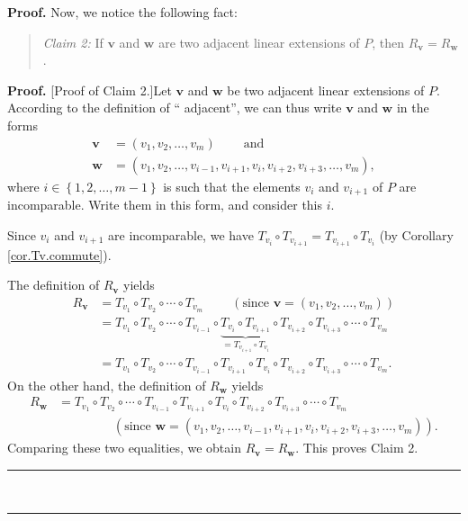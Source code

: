 \documentclass[numbers=enddot,12pt,final,onecolumn,notitlepage]{scrartcl}%
\theoremstyle{definition}
\newenvironment{verlong}{}{}
\newenvironment{statement}{\begin{quote}}{\end{quote}}
\newenvironment{proof}[1][Proof]{\noindent\textbf{#1.} }{\ \rule{0.5em}{0.5em}}
\begin{document}
\begin{verlong}
\begin{proof}
Now, we notice the following fact:

\begin{statement}
\textit{Claim 2:} If $\mathbf{v}$ and $\mathbf{w}$ are two adjacent linear
extensions of $P$, then $R_{\mathbf{v}}=R_{\mathbf{w}}$.
\end{statement}

\begin{proof}
[Proof of Claim 2.]Let $\mathbf{v}$ and $\mathbf{w}$ be two adjacent linear
extensions of $P$. According to the definition of \textquotedblleft
adjacent\textquotedblright, we can thus write $\mathbf{v}$ and $\mathbf{w}$ in
the forms
\begin{align*}
\mathbf{v}  &  =\left(  v_{1},v_{2},\ldots,v_{m}\right)
\ \ \ \ \ \ \ \ \ \ \text{and}\\
\mathbf{w}  &  =\left(  v_{1},v_{2},\ldots,v_{i-1},v_{i+1},v_{i}%
,v_{i+2},v_{i+3},\ldots,v_{m}\right)  ,
\end{align*}
where $i\in\left\{  1,2,\ldots,m-1\right\}  $ is such that the elements
$v_{i}$ and $v_{i+1}$ of $P$ are incomparable. Write them in this form, and
consider this $i$.

Since $v_{i}$ and $v_{i+1}$ are incomparable, we have $T_{v_{i}}\circ
T_{v_{i+1}}=T_{v_{i+1}}\circ T_{v_{i}}$ (by Corollary \ref{cor.Tv.commute}).

The definition of $R_{\mathbf{v}}$ yields
\begin{align*}
R_{\mathbf{v}}  &  =T_{v_{1}}\circ T_{v_{2}}\circ\cdots\circ T_{v_{m}%
}\ \ \ \ \ \ \ \ \ \ \left(  \text{since }\mathbf{v}=\left(  v_{1}%
,v_{2},\ldots,v_{m}\right)  \right) \\
&  =T_{v_{1}}\circ T_{v_{2}}\circ\cdots\circ T_{v_{i-1}}\circ
\underbrace{T_{v_{i}}\circ T_{v_{i+1}}}_{=T_{v_{i+1}}\circ T_{v_{i}}}\circ
T_{v_{i+2}}\circ T_{v_{i+3}}\circ\cdots\circ T_{v_{m}}\\
&  =T_{v_{1}}\circ T_{v_{2}}\circ\cdots\circ T_{v_{i-1}}\circ T_{v_{i+1}}\circ
T_{v_{i}}\circ T_{v_{i+2}}\circ T_{v_{i+3}}\circ\cdots\circ T_{v_{m}}.
\end{align*}
On the other hand, the definition of $R_{\mathbf{w}}$ yields
\begin{align*}
R_{\mathbf{w}}  &  =T_{v_{1}}\circ T_{v_{2}}\circ\cdots\circ T_{v_{i-1}}\circ
T_{v_{i+1}}\circ T_{v_{i}}\circ T_{v_{i+2}}\circ T_{v_{i+3}}\circ\cdots\circ
T_{v_{m}}\\
&  \ \ \ \ \ \ \ \ \ \ \ \ \ \ \ \ \ \ \ \ \left(  \text{since }%
\mathbf{w}=\left(  v_{1},v_{2},\ldots,v_{i-1},v_{i+1},v_{i},v_{i+2}%
,v_{i+3},\ldots,v_{m}\right)  \right)  .
\end{align*}
Comparing these two equalities, we obtain $R_{\mathbf{v}}=R_{\mathbf{w}}$.
This proves Claim 2.
\end{proof}


\end{proof}
\end{verlong}
\end{document}
